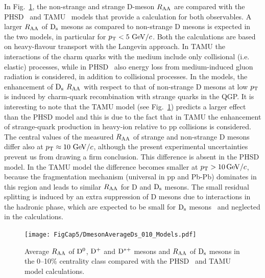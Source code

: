 In Fig.~\ref{fig:DandDsRaaWithModels},  the non-strange and 
strange D-meson $R_{\rm AA}$ are compared with  
the PHSD~\cite{Song:2015ykw} and 
 TAMU~\cite{He:2014cla} models that provide a calculation for both observables. A larger
 $R_{\rm AA}$ of ${\rm D_s}$ mesons as compared to non-strange D mesons is expected in the two models, in particular for $p_{\rm T}<5~\mathrm{GeV}/c$.
Both the calculations are based on heavy-flavour transport with the Langevin approach.
In TAMU the interactions of the charm quarks with the medium include only collisional (i.e.\,elastic) processes, 
while in PHSD~\cite{Song:2015ykw} also energy loss from medium-induced gluon radiation
is considered, in addition to collisional processes.
In the models, the enhancement of ${\rm D_s}$ $R_{\rm AA}$ with respect to that of non-strange D mesons at low $p_{\rm T}$ is induced 
by charm-quark recombination with strange quarks in the QGP.
It is interesting to note that the TAMU model (see Fig.~\ref{fig:DandDsRaaWithModels}) predicts a larger effect than the 
 PHSD model and this is due to the fact that in TAMU the enhancement
of strange-quark production in heavy-ion relative to pp collisions is considered.
The central values of the measured $R_{\rm AA}$ of strange and non-strange D mesons differ also 
at $p_{\rm T} \approx 10~\mathrm{GeV}/c$, although the present experimental 
uncertainties prevent us from drawing a firm conclusion. This 
difference is absent in the PHSD model. In the TAMU model the difference  
becomes smaller at $p_{\rm T} > 10 \, \mathrm{GeV}/c$, because the fragmentation mechanism (universal in pp and Pb-Pb) dominates in this region and 
leads to similar $R_{\rm AA}$ for D and ${\rm D_s}$ mesons. The small residual splitting is induced by an extra suppression of D mesons
due to interactions in the hadronic phase, which are expected to be small for ${\rm D_s}$ mesons~\cite{He:2012df} and
neglected in the calculations. 
\\


\begin{figure}[!t]
 \begin{center}
\texttt{[image: FigCap5/DmesonAverageDs\_010\_Models.pdf]}
 \end{center}
 \caption{Average $R_{\rm AA}$ of ${\rm D^0}$, ${\rm D^+}$ and ${\rm D^{*+}}$ mesons and $R_{\rm AA}$ of ${\rm D_s}$ mesons in the 0--10\% centrality class compared with the PHSD~\cite{Song:2015ykw}  and TAMU~\cite{He:2014cla} model calculations.}
 \label{fig:DandDsRaaWithModels} 
\end{figure} 




